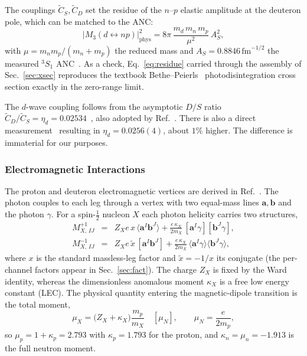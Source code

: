 \documentclass[
  aps,prd,twocolumn,nofootinbib,superscriptaddress,
  longbibliography,floatfix,preprintnumbers
]{revtex4-2}
\newcommand{\muN}{\mu_{N}}
\newcommand{\ad}[2]{\langle #1 #2\rangle}
\newcommand{\sq}[2]{[#1 #2]}
\newcommand{\AS}{A_{S}}
\newcommand{\CSv}{\tilde{C}_{S}}
\newcommand{\CDv}{\tilde{C}_{D}}
\begin{document}
The couplings $\CSv,\CDv$ set the residue of the $n$--$p$ elastic amplitude at the deuteron pole, which can be matched to the ANC:
\begin{equation}
  |M_3(d\!\leftrightarrow\! np)|^2_{\mathrm{phys}}
  = 8\pi\,\frac{m_d\,m_n\,m_p}{\mu^2}\,\AS^2 ,
  \label{eq:residue}
\end{equation}
with $\mu=m_n m_p/(m_n+m_p)$ the reduced mass and
$\AS=0.8846\,\mathrm{fm}^{-1/2}$ the measured $^3S_1$ ANC~\cite{deSwart:1995ui}.  
As a check, Eq.~\eqref{eq:residue} carried through the assembly of Sec.~\ref{sec:xsec} reproduces the textbook Bethe--Peierls~\cite{Bethe:1935diplon} photodisintegration cross section exactly in the zero-range limit.

The $d$-wave coupling follows from the asymptotic $D/S$ ratio $\CDv/\CSv=\eta_d =0.02534$~\cite{deSwart:1995ui}, also adopted by Ref.~\cite{Rupak:1999rk}. There is also a direct
measurement~\cite{Rodning:1990zz} resulting in $\eta_{d}=0.0256(4)$, about $1\%$ higher.
The difference is immaterial for our purposes.

\subsubsection{Electromagnetic Interactions} 

The proton and deuteron electromagnetic vertices are derived in Ref.~\cite{Tait:2026guk}. The photon
couples to each leg through a vertex with two equal-mass lines $\bm{a},\bm{b}$
and the photon $\gamma$. For a spin-$\tfrac12$ nucleon $X$ each photon helicity
carries two structures,
\begin{eqnarray}
  M^{+1}_{X,\,IJ} &=& Z_{X}e\,x\,\ad{\bm{a}^{I}}{\bm{b}^{J}}
     + \frac{e\,\kappa_{X}}{2m_{X}}\,\sq{\bm{a}^{I}}{\gamma}\sq{\bm{b}^{J}}{\gamma},
     \nonumber\\
  M^{-1}_{X,\,IJ} &=& Z_{X}e\,\tilde{x}\,\sq{\bm{a}^{I}}{\bm{b}^{J}}
     + \frac{e\,\kappa_{X}}{2m_{X}}\,\ad{\bm{a}^{I}}{\gamma}\ad{\bm{b}^{J}}{\gamma},
  \label{eq:photonN}
\end{eqnarray}
where $x$ is the standard massless-leg factor and $\tilde{x}=-1/x$ its conjugate
(the per-channel factors appear in Sec.~\ref{sec:fact}). The charge $Z_{X}$ is fixed
by the Ward identity, whereas the dimensionless anomalous moment $\kappa_{X}$ is a free
low energy constant (LEC). The physical quantity entering the magnetic-dipole transition is the total
moment,
\begin{equation}
  \mu_{X} = \big(Z_{X}+\kappa_{X}\big)\frac{m_{p}}{m_{X}}\quad[\muN],
  \qquad \muN=\frac{e}{2m_{p}},
  \label{eq:totalmoment}
\end{equation}
so $\mu_{p}=1+\kappa_{p}=2.793$ with $\kappa_{p}=1.793$ for the proton, and $\kappa_n=\mu_n=-1.913$ is the full neutron moment.
\end{document}
